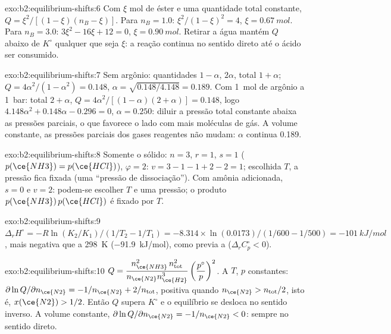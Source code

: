 \begin{solution}{exo:b2:equilibrium-shifts:6}
Com $\xi$ mol de éster e uma quantidade total constante, $Q =
\xi^2/[(1 - \xi)(n_B - \xi)]$. Para $n_B = 1.0$: $\xi^2/(1 - \xi)^2 = 4$, $\xi
= \qty{0.67}{mol}$. Para $n_B = 3.0$: $3\xi^2 - 16\xi + 12 = 0$, $\xi =
\qty{0.90}{mol}$. Retirar a água mantém $Q$ abaixo de $K^\circ$ qualquer que
seja $\xi$: a reação continua no sentido direto até o ácido ser consumido.
\end{solution}

\begin{solution}{exo:b2:equilibrium-shifts:7}
Sem argônio: quantidades $1 - \alpha$, $2\alpha$, total $1 + \alpha$;
$Q = 4\alpha^2/(1 - \alpha^2) = 0.148$, $\alpha = \sqrt{0.148/4.148} = 0.189$.
Com \qty{1}{mol} de argônio a \qty{1}{bar}: total $2 + \alpha$, $Q =
4\alpha^2/[(1 - \alpha)(2 + \alpha)] = 0.148$, logo $4.148\alpha^2 + 0.148\alpha
- 0.296 = 0$, $\alpha = 0.250$: diluir a pressão total constante abaixa as
pressões parciais, o que favorece o lado com mais moléculas de gás. A
volume constante, as pressões parciais dos gases reagentes não mudam:
$\alpha$ continua 0.189.
\end{solution}

\begin{solution}{exo:b2:equilibrium-shifts:8}
Somente o sólido: $n = 3$, $r = 1$, $s = 1$ ($p(\ce{NH3}) = p(\ce{HCl})$),
$\varphi = 2$: $v = 3 - 1 - 1 + 2 - 2 = 1$; escolhida $T$, a pressão fica
fixada (uma ``pressão de dissociação''). Com amônia adicionada, $s = 0$ e $v = 2$:
podem-se escolher $T$ e uma pressão; o produto $p(\ce{NH3})\,p(\ce{HCl})$ é
fixado por $T$.
\end{solution}

\begin{solution}{exo:b2:equilibrium-shifts:9}
$\Delta_r H^\circ = -R\ln(K_2/K_1)/(1/T_2 - 1/T_1) = -8.314 \times
\ln(0.0173)/(1/600 - 1/500) = \qty{-101}{kJ/mol}$, mais negativa que a
\qty{298}{K} (\qty{-91.9}{kJ/mol}), como previa a 
($\Delta_r C_p^\circ < 0$).
\end{solution}

\begin{solution}{exo:b2:equilibrium-shifts:10}
$Q = \dfrac{n_{\ce{NH3}}^2\,n_{\text{tot}}^2}{n_{\ce{N2}}n_{\ce{H2}}^3}
\left(\dfrac{p^\circ}{p}\right)^2$. A $T$, $p$ constantes:
$\partial\ln Q/\partial n_{\ce{N2}} = -1/n_{\ce{N2}} + 2/n_{\text{tot}}$, positiva
quando $n_{\ce{N2}} > n_{\text{tot}}/2$, isto é, $x(\ce{N2}) > 1/2$. Então $Q$
supera $K^\circ$ e o equilíbrio se desloca no sentido inverso. A volume constante,
$\partial\ln Q/\partial n_{\ce{N2}} = -1/n_{\ce{N2}} < 0$: sempre no sentido direto.
\end{solution}

